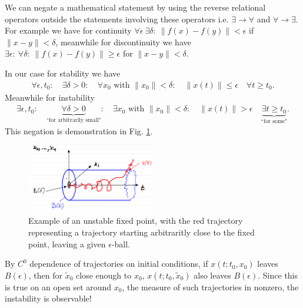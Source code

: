 \begin{remark}[]
	We can negate a mathematical statement by using the reverse relational operators outside the statements involving these operators i.e. $ \exists \to \forall $ and $\forall \to \exists $. For example we have for continuity $\forall \epsilon\ \exists \delta:\  \|f( {x}) - f( {y}) \| < \epsilon$ if $ \| {x}- {y} \|<\delta$, meanwhile for discontinuity we have  $\exists \epsilon:\ \forall \delta:\  \|f( {x}) - f( {y}) \| \geq  \epsilon$ for $ \| {x}- {y} \|< \delta$.

	In our case for stability we have
	\begin{align}
		\forall \epsilon,t_0: \quad \exists \delta>0: \quad \forall  {x}_0  \textrm{ with }  \| {x}_0 \| < \delta: \quad  \| {x}(t) \|\leq \epsilon \quad \forall t\geq t_0.
	\end{align}
Meanwhile for instability 
\begin{align}
	\exists \epsilon,t_0:\quad \underbrace{\forall \delta>0}_{ \textrm{``for arbitrarily small"} }:\quad \exists  {x}_0  \textrm{ with }  \| {x}_0 \|<\delta: \quad  \| {x}(t) \|>\epsilon \quad \underbrace{\exists t\geq t_0}_{ \textrm{``for some"} }.
\end{align}
This negation is demonstration in Fig. \ref{fig:instable_def}.
\begin{figure}[h!]
	\centering
	\includegraphics[width=0.5\textwidth]{figures/ch2/6unstable_def.png}
	\caption{Example of an unstable fixed point, with the red trajectory representing a trajectory starting arbitraritly close to the fixed point, leaving a given $\epsilon$-ball.}
	\label{fig:instable_def}
\end{figure}
\end{remark}

\begin{remark}[]
	By $C^0$ dependence of trajectories on initial conditions, if $ {x}(t;t_0, {x}_0)$ leaves $B(\epsilon)$, then for $\tilde{ {x}}_0$ close enough to $ {x}_0$, $ {x}(t;t_0,\tilde{ {x}}_0)$ also leaves $B(\epsilon)$. Since this is true on an open set around ${x}_0$, the measure of such trajectories in nonzero, the instability is observable!
\end{remark}

